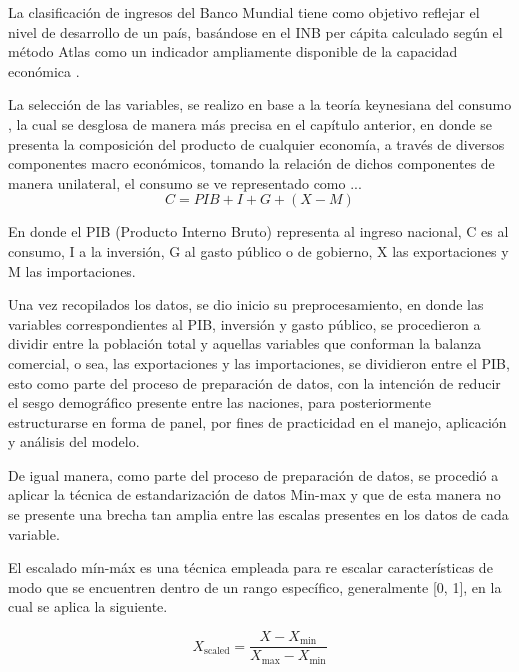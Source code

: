 \documentclass[conference]{IEEEtran}
\begin{document}
La clasificación de ingresos del Banco Mundial tiene como objetivo reflejar el nivel de desarrollo de un país, basándose en el INB per cápita calculado según el método Atlas como un indicador ampliamente disponible de la capacidad económica \cite{Worldbankblog}.

La selección de las variables, se realizo en base a la teoría keynesiana del consumo \cite{keynes1937}, la cual se desglosa de manera más precisa en el capítulo anterior, en donde se presenta la composición del producto de cualquier economía, a través de diversos componentes macro económicos, tomando la relación de dichos componentes de manera unilateral, el consumo se ve representado como ...
\begin{equation}
    C = PIB + I + G + (X - M)
\end{equation}

En donde el PIB (Producto Interno Bruto) representa al ingreso nacional, C es al consumo, I a la inversión, G al gasto público o de gobierno, X  las exportaciones y M  las importaciones.

Una vez recopilados los datos, se dio inicio su preprocesamiento, en donde las variables correspondientes al PIB, inversión y gasto público, se procedieron a dividir entre la población total y aquellas variables que conforman la balanza comercial, o sea, las exportaciones y las importaciones, se dividieron entre el PIB, esto como parte del proceso de preparación de datos, con la intención de reducir el sesgo demográfico presente entre las naciones, para posteriormente estructurarse en forma de panel, por fines de practicidad en el manejo, aplicación y análisis del modelo.

De igual manera, como parte del proceso de preparación de datos, se procedió a aplicar la técnica de estandarización de datos Min-max y que de esta manera no se presente una brecha tan amplia entre las escalas presentes en los datos de cada variable.

El escalado mín-máx es una técnica empleada para re escalar características de modo que se encuentren dentro de un rango específico, generalmente [0, 1], en la cual se aplica la siguiente.

\begin{equation}
    X_{\text{scaled}} = \frac{X - X_{\text{min}}}{X_{\text{max}} - X_{\text{min}}}
\end{equation}
\end{document}
